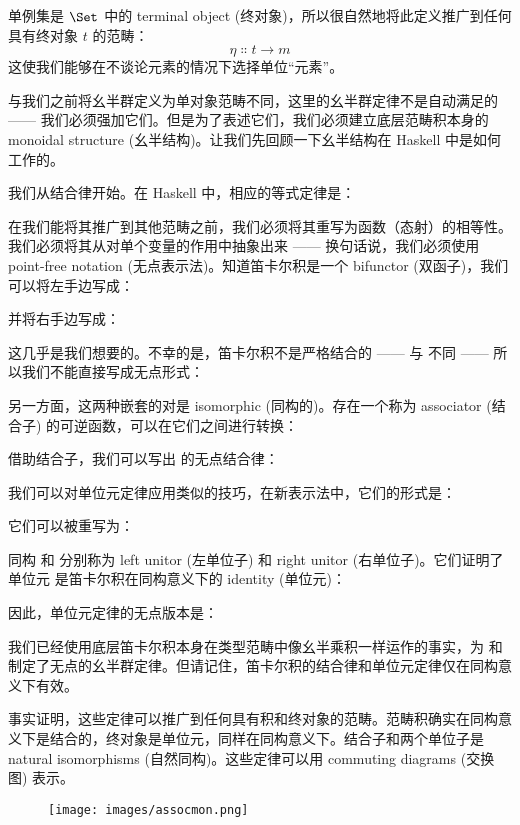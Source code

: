 单例集是 $\Set$ 中的 terminal object (终对象)，所以很自然地将此定义推广到任何具有终对象 $t$ 的范畴：
\[\eta \Colon t \to m\]
这使我们能够在不谈论元素的情况下选择单位“元素”。

与我们之前将幺半群定义为单对象范畴不同，这里的幺半群定律不是自动满足的 —— 我们必须强加它们。但是为了表述它们，我们必须建立底层范畴积本身的 monoidal structure (幺半结构)。让我们先回顾一下幺半结构在 Haskell 中是如何工作的。

我们从结合律开始。在 Haskell 中，相应的等式定律是：

在我们能将其推广到其他范畴之前，我们必须将其重写为函数（态射）的相等性。我们必须将其从对单个变量的作用中抽象出来 —— 换句话说，我们必须使用 point-free notation (无点表示法)。知道笛卡尔积是一个 bifunctor (双函子)，我们可以将左手边写成：

并将右手边写成：

这几乎是我们想要的。不幸的是，笛卡尔积不是严格结合的 ——  与  不同 —— 所以我们不能直接写成无点形式：

另一方面，这两种嵌套的对是 isomorphic (同构的)。存在一个称为 associator (结合子) 的可逆函数，可以在它们之间进行转换：

借助结合子，我们可以写出  的无点结合律：

我们可以对单位元定律应用类似的技巧，在新表示法中，它们的形式是：

它们可以被重写为：

同构  和  分别称为 left unitor (左单位子) 和 right unitor (右单位子)。它们证明了单位元 \code{()} 是笛卡尔积在同构意义下的 identity (单位元)：


因此，单位元定律的无点版本是：

我们已经使用底层笛卡尔积本身在类型范畴中像幺半乘积一样运作的事实，为  和  制定了无点的幺半群定律。但请记住，笛卡尔积的结合律和单位元定律仅在同构意义下有效。

事实证明，这些定律可以推广到任何具有积和终对象的范畴。范畴积确实在同构意义下是结合的，终对象是单位元，同样在同构意义下。结合子和两个单位子是 natural isomorphisms (自然同构)。这些定律可以用 commuting diagrams (交换图) 表示。

\begin{figure}[H]
  \centering
  \texttt{[image: images/assocmon.png]}
\end{figure}

